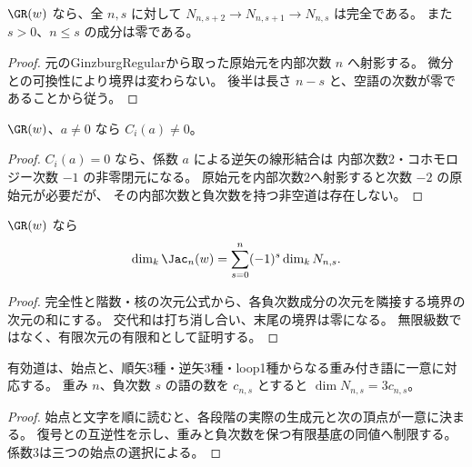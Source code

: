 \begin{lemma}[内部次数ごとの負次数完全性]\label{lem:negative-exact}
\leanok
{}
$\GR(w)$ なら、全 $n,s$ に対して
$N_{n,s+2}\to N_{n,s+1}\to N_{n,s}$ は完全である。
また $s>0$、$n\le s$ の成分は零である。
\end{lemma}
\begin{proof}\leanok
元のGinzburgRegularから取った原始元を内部次数 $n$ へ射影する。
微分との可換性により境界は変わらない。
後半は長さ $n-s$ と、空語の次数が零であることから従う。
\end{proof}

\begin{lemma}[階数0の縮約の排除]\label{lem:rank-zero}
\leanok
{}
$\GR(w)$、$a\ne0$ なら $C_i(a)\ne0$。
\end{lemma}
\begin{proof}\leanok
$C_i(a)=0$ なら、係数 $a$ による逆矢の線形結合は
内部次数2・コホモロジー次数 $-1$ の非零閉元になる。
原始元を内部次数2へ射影すると次数 $-2$ の原始元が必要だが、
その内部次数と負次数を持つ非空道は存在しない。
\end{proof}

\begin{lemma}[有限Euler等式]\label{lem:euler}
\leanok
{}
$\GR(w)$ なら
\[
 \dim_k\Jac_n(w)=\sum_{s=0}^n(-1)^s\dim_k N_{n,s}.
\]
\end{lemma}
\begin{proof}\leanok
完全性と階数・核の次元公式から、各負次数成分の次元を隣接する境界の次元の和にする。
交代和は打ち消し合い、末尾の境界は零になる。
無限級数ではなく、有限次元の有限和として証明する。
\end{proof}

\begin{lemma}[有効道の有限計数]\label{lem:path-count}
\leanok
{}
有効道は、始点と、順矢3種・逆矢3種・loop1種からなる重み付き語に一意に対応する。
重み $n$、負次数 $s$ の語の数を $c_{n,s}$ とすると $\dim N_{n,s}=3c_{n,s}$。
\end{lemma}
\begin{proof}\leanok
始点と文字を順に読むと、各段階の実際の生成元と次の頂点が一意に決まる。
復号との互逆性を示し、重みと負次数を保つ有限基底の同値へ制限する。
係数3は三つの始点の選択による。
\end{proof}

